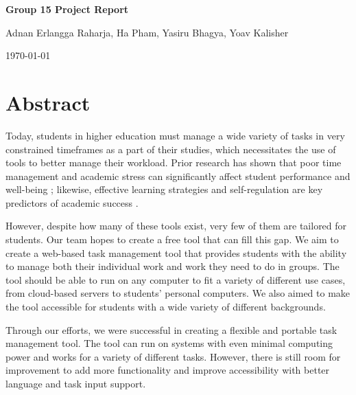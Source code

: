 \documentclass[11pt,oneside]{article}
\begin{document}
\begin{titlepage}
    \centering
    \vspace*{3cm} %

    {\Huge\bfseries Group 15 Project Report\par}
    \vspace{2cm}

    {\Large Adnan Erlangga Raharja, Ha Pham, Yasiru Bhagya, Yoav Kalisher\par}
    \vspace{2cm}

    {\Large \today\par}

    \vfill
\end{titlepage}

\vspace*{3cm}
\section*{Abstract}

Today, students in higher education must manage a wide variety of tasks in very constrained timeframes as a part of their studies, which necessitates the use of tools to better manage their workload. Prior research has shown that poor time management and academic stress can significantly affect student performance and well-being \citep{misra2000college}; likewise, effective learning strategies and self-regulation are key predictors of academic success \citep{zimmerman2002becoming}.

However, despite how many of these tools exist, very few of them are tailored for students. Our team hopes to create a free tool that can fill this gap. We aim to create a web-based task management tool that provides students with the ability to manage both their individual work and work they need to do in groups. The tool should be able to run on any computer to fit a variety of different use cases, from cloud-based servers to students' personal computers. We also aimed to make the tool accessible for students with a wide variety of different backgrounds.

Through our efforts, we were successful in creating a flexible and portable task management tool. The tool can run on systems with even minimal computing power and works for a variety of different tasks. However, there is still room for improvement to add more functionality and improve accessibility with better language and task input support.
\end{document}
